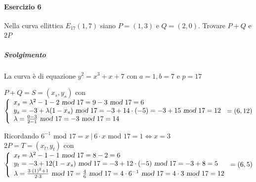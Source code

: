 \documentclass[10pt]{book}
\begin{document}
\paragraph{Esercizio 6} Nella curva ellittica $E_{17}(1,7)$ siano $P=(1,3)$ e $Q=(2,0)$. Trovare $P+Q$ e $2P$
\subparagraph{Svolgimento} La curva è di equazione $y^2 = x^3 + x + 7$ con $a=1,b=7$ e $p=17$
\begin{list}{}{Formule a p. 48}
	\item $P+Q = S = (x_s, y_s)$ con $\left\{\begin{array}{l}
	x_s = \lambda^2 -1-2\textsl{ mod }17 = 9 - 3\textsl{ mod }17 = 6\\
	y_s = -3 +\lambda(1-x_s)\textsl{ mod }17 = -3 +14\cdot(-5) = -3 +15\textsl{ mod }17 = 12\\
	\lambda = \frac{0-3}{2-1}\textsl{ mod }17 = -3\textsl{ mod }17 = 14
	\end{array}\right. = (6,12)$
	\item Ricordando $6^{-1}$ mod $17 = x\:|\: 6\cdot x$ mod $17 = 1 \Leftrightarrow x = 3$\\
	$2P = T = (x_t, y_t)$ con $\left\{ \begin{array}{l}
	x_t = \lambda^2 -1-1\textsl{ mod }17 = 8-2 = 6\\
	y_t = -3 + 12(1-x_s)\textsl{ mod }17 = -3 + 12\cdot(-5)\textsl{ mod }17 = -3 +8 = 5\\
	\lambda = \frac{3\cdot\left(1\right)^2+1}{2\cdot3}\textsl{ mod }17 = \frac{4}{6}\textsl{ mod }17 = 4\cdot6^{-1}\textsl{ mod }17=4\cdot3\textsl{ mod }17 = 12
	\end{array}\right. = (6,5)$
\end{list}
\pagebreak
\end{document}
